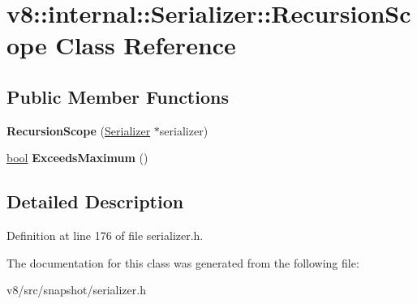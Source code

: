 \hypertarget{classv8_1_1internal_1_1Serializer_1_1RecursionScope}{}\section{v8\+:\+:internal\+:\+:Serializer\+:\+:Recursion\+Scope Class Reference}
\label{classv8_1_1internal_1_1Serializer_1_1RecursionScope}
\subsection*{Public Member Functions}
\begin{DoxyCompactItemize}
\item 
\mbox{\label{classv8_1_1internal_1_1Serializer_1_1RecursionScope_ac378dfab36cf5a01f850940e8cd6ffc6}} 
{\bfseries Recursion\+Scope} (\mbox{\hyperlink{classv8_1_1internal_1_1Serializer}{Serializer}} $\ast$serializer)
\item 
\mbox{\label{classv8_1_1internal_1_1Serializer_1_1RecursionScope_ae0fe43f43354131651b5048c644c5d24}} 
\mbox{\hyperlink{classbool}{bool}} {\bfseries Exceeds\+Maximum} ()
\end{DoxyCompactItemize}


\subsection{Detailed Description}


Definition at line 176 of file serializer.\+h.



The documentation for this class was generated from the following file\+:\begin{DoxyCompactItemize}
\item 
v8/src/snapshot/serializer.\+h\end{DoxyCompactItemize}
